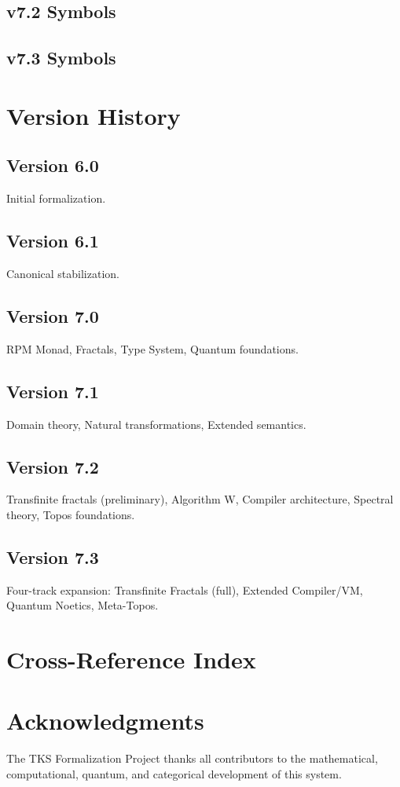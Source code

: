 \documentclass[11pt,twoside,openright]{book}
\theoremstyle{definition}
\theoremstyle{plain}
\theoremstyle{remark}
\begin{document}
\section{v7.2 Symbols}

\section{v7.3 Symbols}

\chapter{Version History}
\label{ch:version-history}

\section{Version 6.0}
Initial formalization.

\section{Version 6.1}
Canonical stabilization.

\section{Version 7.0}
RPM Monad, Fractals, Type System, Quantum foundations.

\section{Version 7.1}
Domain theory, Natural transformations, Extended semantics.

\section{Version 7.2}
Transfinite fractals (preliminary), Algorithm W, Compiler architecture, Spectral theory, Topos foundations.

\section{Version 7.3}
Four-track expansion: Transfinite Fractals (full), Extended Compiler/VM, Quantum Noetics, Meta-Topos.

\chapter{Cross-Reference Index}
\label{ch:cross-reference}


\backmatter

\chapter*{Acknowledgments}

The TKS Formalization Project thanks all contributors to the mathematical, computational, quantum, and categorical development of this system.
\end{document}
